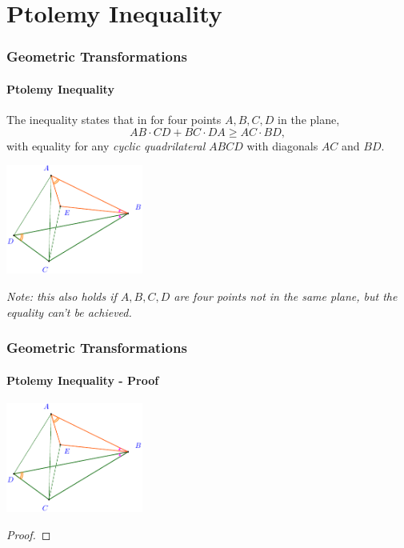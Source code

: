 \documentclass[8pt,xcolor=table,dvipsnames]{beamer}
\begin{document}
\section{Ptolemy Inequality}

\begin{frame}[t]
    \frametitle{Geometric Transformations}
    \framesubtitle{Ptolemy Inequality}
    \begin{theorem}
        \label{theorem:ptolemy-inequality}
        The inequality states that in for four points $A, B, C, D$ in the plane,
        \[
            AB \cdot CD + BC \cdot DA \ge AC \cdot BD,
        \]
        with equality for any \textit{cyclic quadrilateral} $ABCD$ with diagonals $AC$ and $BD$.
    \end{theorem}
    \begin{center}
        \includegraphics[width=4.5cm]{./svg/pdf/ptolemy-inequality-1.pdf}
    \end{center}
    \textit{Note: this also holds if $A,B,C,D$ are four points not in the same plane, but the equality can't be achieved.}
\end{frame}

\begin{frame}[t]
    \frametitle{Geometric Transformations}
    \framesubtitle{Ptolemy Inequality - Proof}
    \begin{center}
        \includegraphics[width=4.5cm]{./svg/pdf/ptolemy-inequality-1.pdf}
    \end{center}
    \begin{proof}
    \end{proof}
\end{frame}
\end{document}
